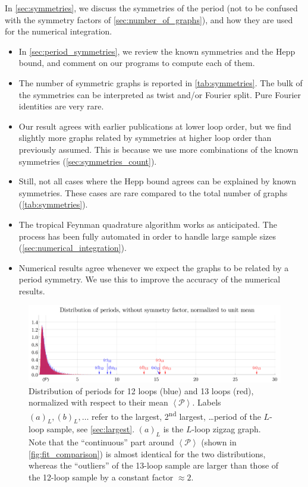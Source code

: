 \documentclass[12pt,a4paper]{article}
\newcommand{\period}{\mathcal P}
\renewcommand{\|}{\rule[-0.4ex]{0.2ex}{1.2em}}
\begin{document}
\noindent
In \cref{sec:symmetries}, we discuss the symmetries of the period (not to be confused with the symmetry factors of \cref{sec:number_of_graphs}), and how they are used for the numerical integration.
\begin{itemize}
	\item In \cref{sec:period_symmetries}, we review the known symmetries and the Hepp bound, and comment on our programs to compute each of them. 
	\item The number of symmetric graphs is reported in \cref{tab:symmetries}.  The bulk of the symmetries can be interpreted as twist and/or Fourier split. Pure Fourier identities are very rare.
	\item  Our result agrees with earlier publications at lower loop order, but we find slightly more graphs related by symmetries at higher loop order than previously assumed. This is because we use more combinations of the known symmetries  (\cref{sec:symmetries_count}). 
	\item Still, not all cases where the Hepp bound agrees can be explained by known symmetries. These cases are rare  compared to the total number of graphs (\cref{tab:symmetries}).
	\item The tropical Feynman quadrature algorithm  \cite{borinsky_tropical_2023a} works as anticipated. The process has been fully automated in order to handle  large sample sizes (\cref{sec:numerical_integration}).
	\item Numerical results agree whenever we expect the graphs to be related by a period symmetry. We use this to improve the accuracy of the numerical results.
\end{itemize}

\FloatBarrier


\begin{figure} 
	\centering
	\includegraphics[width=.9\linewidth]{distribution.pdf}
	\caption{Distribution of periods for 12 loops (blue) and 13 loops (red), normalized with respect to their mean $\left \langle \period \right \rangle $. Labels $(a)_L, (b)_L, \ldots$ refer to the largest, 2\textsuperscript{nd} largest, \ldots period of the $L$-loop sample, see \cref{sec:largest}. $(a)_L$ is the $L$-loop zigzag graph. Note that the \enquote{continuous} part around $\left \langle \period \right \rangle $  (shown in \cref{fig:fit_comparison}) is almost identical for the two distributions, whereas the \enquote{outliers} of the 13-loop sample  are larger than those of the 12-loop sample by a constant factor $\approx  2$. }
	\label{fig:distribution}
\end{figure}
	
\end{document}
